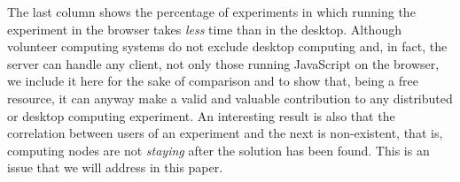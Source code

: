\documentclass{sig-alternate}
\begin{document}
The last column shows the percentage of experiments in which running the
experiment in the browser takes {\em less} time than in the
desktop. Although volunteer computing systems do not exclude desktop
computing and, in fact, the server can handle any client, not only
those running JavaScript on the browser, we include it here for the
sake of comparison and to show that, being a free resource, it can
anyway make a valid and valuable contribution to any distributed or
desktop computing experiment. An interesting result is also that the
correlation between users of an experiment and the next is
non-existent, that is, computing nodes are not {\em
  staying} after the solution has been found. This is an issue that we
will address in this paper. 

%
\end{document}

